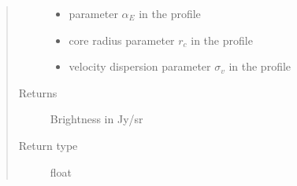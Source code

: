 \documentclass[letterpaper,10pt,english]{sphinxmanual}
\begin{document}
\begin{fulllineitems}
\begin{quote}
\begin{description}
\begin{itemize}
\item {} 
\sphinxAtStartPar
{} \textendash{} parameter \(\alpha_E\) in the {\hyperref[\detokenize{diffsph.profiles:diffsph.profiles.templates.enst}]{}} profile

\item {} 
\sphinxAtStartPar
{} \textendash{} core radius parameter \(r_c\) in the {\hyperref[\detokenize{diffsph.profiles:diffsph.profiles.templates.cnfw}]{}} profile

\item {} 
\sphinxAtStartPar
{} \textendash{} velocity dispersion parameter \(\sigma_v\) in the {\hyperref[\detokenize{diffsph.profiles:diffsph.profiles.templates.sis}]{}} profile

\end{itemize}

\item[{Returns}] \leavevmode
\sphinxAtStartPar
Brightness in Jy/sr

\item[{Return type}] \leavevmode
\sphinxAtStartPar
float

\end{description}\end{quote}

\end{fulllineitems}

\end{document}
